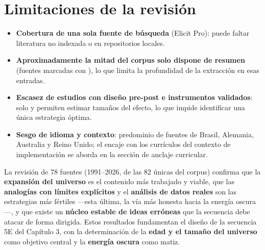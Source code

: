 \section{Limitaciones de la revisión}\label{sec:limitaciones}

\begin{itemize}
\item \textbf{Cobertura de una sola fuente de búsqueda} (Elicit Pro): puede faltar literatura no indexada o en repositorios locales.
\item \textbf{Aproximadamente la mitad del corpus solo dispone de resumen} (fuentes marcadas con \dagmark{}), lo que limita la profundidad de la extracción en esas entradas.
\item \textbf{Escasez de estudios con diseño pre-post e instrumentos validados}: solo \textcite{gasparini2025} y \textcite{dua2020} permiten estimar tamaños del efecto, lo que impide identificar una única estrategia óptima.
\item \textbf{Sesgo de idioma y contexto}: predominio de fuentes de Brasil, Alemania, Australia y Reino Unido; el encaje con los currículos del contexto de implementación se aborda en la sección de anclaje curricular.
\end{itemize}

La revisión de 78 fuentes (1991--2026, de las 82 únicas del corpus) confirma que la \textbf{expansión del universo} es el contenido más trabajado y viable, que las \textbf{analogías con límites explícitos} y el \textbf{análisis de datos reales} son las estrategias más fértiles ---esta última, la vía más honesta hacia la energía oscura---, y que existe un \textbf{núcleo estable de ideas erróneas} que la secuencia debe atacar de forma dirigida. Estos resultados fundamentan el diseño de la secuencia 5E del Capítulo 3, con la determinación de la \textbf{edad y el tamaño del universo} como objetivo central y la \textbf{energía oscura} como matiz.
